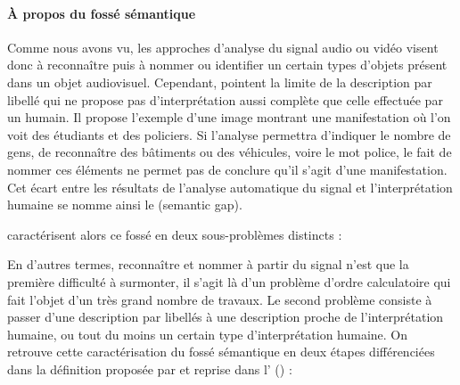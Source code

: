 

\paragraph{À propos du fossé sémantique}
Comme nous avons vu, les approches d'analyse du signal audio ou vidéo visent donc à reconnaître puis à nommer ou identifier un certain types d'objets présent dans un objet audiovisuel. 
Cependant, \cite{hare:semantic-gap} pointent la limite de la description par libellé qui ne propose pas d'interprétation aussi complète que celle effectuée par un humain. 
Il propose l'exemple d'une image montrant une manifestation où l'on voit des étudiants et des policiers. 
Si l'analyse permettra d'indiquer le nombre de gens, de reconnaître des bâtiments ou des véhicules, voire le mot police, le fait de nommer ces éléments ne permet pas de conclure qu'il s'agit d'une manifestation. 
Cet écart entre les résultats de l'analyse automatique du signal et l'interprétation humaine se nomme ainsi le  (semantic gap). 


\citeauthor{hare:semantic-gap} caractérisent alors ce fossé en deux sous-problèmes distincts : 


En d'autres termes, reconnaître et nommer à partir du signal n'est que la première difficulté à surmonter, il s'agit là d'un problème d'ordre calculatoire qui fait l'objet d'un très grand nombre de travaux.
Le second problème consiste à passer d'une description par libellés à une description proche de l'interprétation humaine, ou tout du moins un certain type d'interprétation humaine. 
On retrouve cette caractérisation du fossé sémantique en deux étapes différenciées dans la définition proposée par \cite{Smeulders2000} et reprise dans l' (\cite{Furht2008}) :  %


